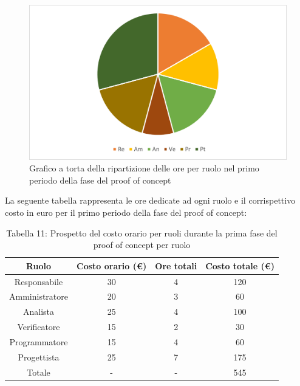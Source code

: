 \begin{figure}[H]
    \centering
    \includegraphics[scale=0.6]{img/grafi preventivo/torta/proof/periodo1.png}
    \caption{Grafico a torta della ripartizione delle ore per ruolo nel primo periodo della fase del proof of concept}
\end{figure}
La seguente tabella rappresenta le ore dedicate ad ogni ruolo e il corrispettivo costo in euro per il primo periodo della fase del proof of concept:
\begin{table}[h]
	\setlength\extrarowheight{5pt}
	\centering
	\begin{tabularx}{\textwidth}{|ccc|c|}
		\hline
		\rowcolor{white}
		\textbf{Ruolo} & \textbf{Costo orario (€)} & \textbf{Ore totali} & \textbf{Costo totale (€)} \\
		\hline
		Responsabile &30&4&120 \\
		Amministratore &20&3&60 \\
		Analista &25&4&100 \\
		Verificatore &15&2&30 \\
		Programmatore &15&4&60 \\
		Progettista &25&7&175 \\
		\hline
		Totale &-&-&545 \\
		\hline
	\end{tabularx}
    \vspace{10pt}
	\caption{Tabella 11: Prospetto del costo orario per ruoli durante la prima fase del proof of concept per ruolo}
\end{table}
